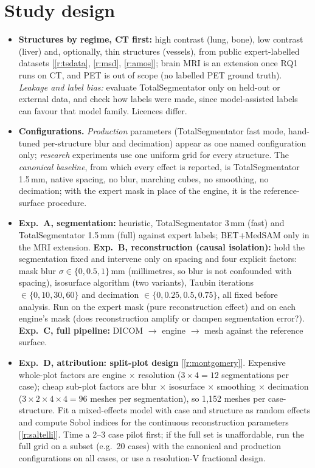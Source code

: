 \documentclass[10pt,a4paper]{article}
\newcommand{\rf}[1]{\ref{#1}}
\begin{document}
\section{Study design}
\begin{itemize}
\item \textbf{Structures by regime, CT first:} high contrast (lung, bone), low contrast (liver) and, optionally, thin structures (vessels), from public expert-labelled datasets [\rf{r:tsdata}, \rf{r:msd}, \rf{r:amos}]; brain MRI is an extension once RQ1 runs on CT, and PET is out of scope (no labelled PET ground truth). \emph{Leakage and label bias:} evaluate TotalSegmentator only on held-out or external data, and check how labels were made, since model-assisted labels can favour that model family. Licences differ.
\item \textbf{Configurations.} \emph{Production} parameters (TotalSegmentator fast mode, hand-tuned per-structure blur and decimation) appear as one named configuration only; \emph{research} experiments use one uniform grid for every structure. The \emph{canonical baseline}, from which every effect is reported, is TotalSegmentator 1.5\,mm, native spacing, no blur, marching cubes, no smoothing, no decimation; with the expert mask in place of the engine, it is the reference-surface procedure.
\item \textbf{Exp.\ A, segmentation:} heuristic, TotalSegmentator 3\,mm (fast) and TotalSegmentator 1.5\,mm (full) against expert labels; BET+MedSAM only in the MRI extension. \textbf{Exp.\ B, reconstruction (causal isolation):} hold the segmentation fixed and intervene only on spacing and four explicit factors: mask blur $\sigma\in\{0,0.5,1\}$\,mm (millimetres, so blur is not confounded with spacing), isosurface algorithm (two variants), Taubin iterations $\in\{0,10,30,60\}$ and decimation $\in\{0,0.25,0.5,0.75\}$, all fixed before analysis. Run on the expert mask (pure reconstruction effect) and on each engine's mask (does reconstruction amplify or dampen segmentation error?). \textbf{Exp.\ C, full pipeline:} DICOM $\rightarrow$ engine $\rightarrow$ mesh against the reference surface.
\item \textbf{Exp.\ D, attribution: split-plot design} [\rf{r:montgomery}]. Expensive whole-plot factors are engine $\times$ resolution ($3\times4=12$ segmentations per case); cheap sub-plot factors are blur $\times$ isosurface $\times$ smoothing $\times$ decimation ($3\times2\times4\times4=96$ meshes per segmentation), so 1{,}152 meshes per case-structure. Fit a mixed-effects model with case and structure as random effects and compute Sobol indices for the continuous reconstruction parameters [\rf{r:saltelli}]. Time a 2--3 case pilot first; if the full set is unaffordable, run the full grid on a subset (e.g.\ 20 cases) with the canonical and production configurations on all cases, or use a resolution-V fractional design.

\end{itemize}
\end{document}
